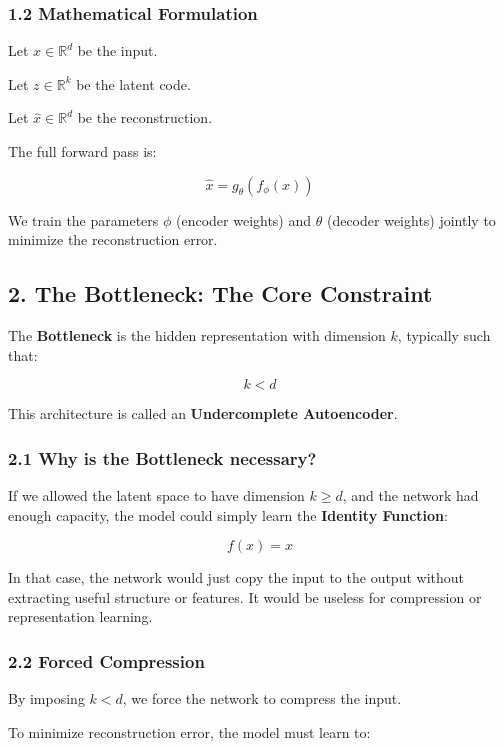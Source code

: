 \documentclass[
  italian,
  11pt,
]{article}
\begin{document}
\subsubsection{1.2 Mathematical
Formulation}\label{mathematical-formulation-3}

Let \(x \in \mathbb{R}^d\) be the input.

Let \(z \in \mathbb{R}^k\) be the latent code.

Let \(\hat{x} \in \mathbb{R}^d\) be the reconstruction.

The full forward pass is:

\[
\hat{x} = g_\theta(f_\phi(x))
\]

We train the parameters \(\phi\) (encoder weights) and \(\theta\)
(decoder weights) jointly to minimize the reconstruction error.

\subsection{2. The Bottleneck: The Core
Constraint}\label{the-bottleneck-the-core-constraint}

The \textbf{Bottleneck} is the hidden representation with dimension
\(k\), typically such that:

\[
k < d
\]

This architecture is called an \textbf{Undercomplete Autoencoder}.

\subsubsection{2.1 Why is the Bottleneck
necessary?}\label{why-is-the-bottleneck-necessary}

If we allowed the latent space to have dimension \(k \ge d\), and the
network had enough capacity, the model could simply learn the
\textbf{Identity Function}:

\[
f(x) = x
\]

In that case, the network would just copy the input to the output
without extracting useful structure or features. It would be useless for
compression or representation learning.

\subsubsection{2.2 Forced Compression}\label{forced-compression}

By imposing \(k < d\), we force the network to compress the input.

To minimize reconstruction error, the model must learn to:
\end{document}
